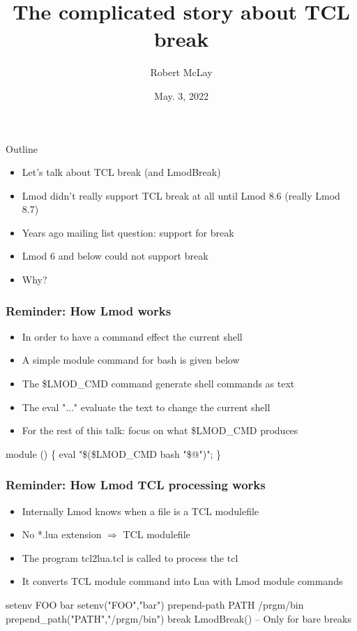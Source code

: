 \documentclass{beamer}
\begin{document}
\title[Lmod]{The complicated story about TCL break}
\author{Robert McLay} 
\date{May. 3, 2022}

\frame{\titlepage} 


\begin{frame}{Outline}
  \begin{itemize}
    \item Let's talk about TCL break (and LmodBreak)
    \item Lmod didn't really support TCL break at all until Lmod 8.6
      (really Lmod 8.7)
    \item Years ago mailing list question: support for break
    \item Lmod 6 and below could not support break
    \item Why?
  \end{itemize}
\end{frame}

\begin{frame}[fragile]
    \frametitle{Reminder: How Lmod works}
  \begin{itemize}
    \item In order to have a command effect the current shell
    \item A simple module command for bash is given below
    \item The \$LMOD\_CMD command generate shell commands as text
    \item The eval "..." evaluate the text to change the current shell
    \item For the rest of this talk: focus on what \$LMOD\_CMD produces
  \end{itemize}
 {\small
    \begin{semiverbatim}
     module () \{ eval "\$(\$LMOD\_CMD bash "\$@")"; \}
    \end{semiverbatim}
}
\end{frame}

\begin{frame}[fragile]
    \frametitle{Reminder: How Lmod TCL processing works}
  \begin{itemize}
    \item Internally Lmod knows when a file is a TCL modulefile 
    \item No *.lua extension $\Rightarrow$ TCL modulefile 
    \item The program tcl2lua.tcl is called to process the tcl 
    \item It converts TCL module command into Lua with Lmod module
      commands
  \end{itemize}
 {\tiny
    \begin{semiverbatim}
setenv FOO bar \Rightarrow setenv("FOO","bar")
prepend-path PATH /prgm/bin \Rightarrow prepend_path("PATH","/prgm/bin")
break \Rightarrow LmodBreak() -- Only for bare breaks
    \end{semiverbatim}
}
\end{frame}
\end{document}
